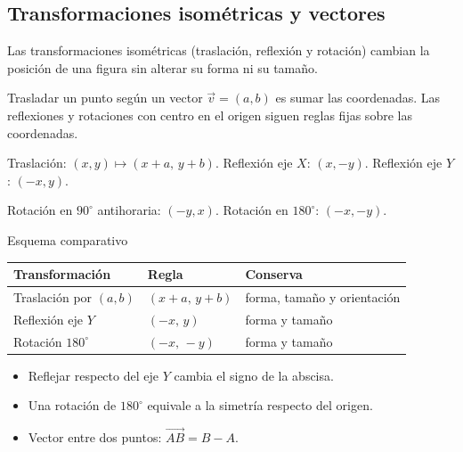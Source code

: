 \documentclass[10pt,a4paper,twocolumn]{article}
\begin{document}
\subsection{Transformaciones isométricas y vectores}

Las transformaciones isométricas (traslación, reflexión y rotación) cambian la posición de una figura sin alterar su forma ni su tamaño.

Trasladar un punto según un vector $\vec{v}=(a,b)$ es sumar las coordenadas. Las reflexiones y rotaciones con centro en el origen siguen reglas fijas sobre las coordenadas.

\begin{ley}
Traslación: $(x,y)\mapsto(x+a,\,y+b)$. Reflexión eje $X$: $(x,-y)$. Reflexión eje $Y$: $(-x,y)$.

Rotación en $90^\circ$ antihoraria: $(-y,x)$. Rotación en $180^\circ$: $(-x,-y)$.
\end{ley}

{\sffamily\footnotesize\color{zinc500} Esquema comparativo}
\begin{center}\small
\begin{tabular}{@{}>{\raggedright\arraybackslash}p{\dimexpr(\linewidth-4\tabcolsep)/3\relax}>{\raggedright\arraybackslash}p{\dimexpr(\linewidth-4\tabcolsep)/3\relax}>{\raggedright\arraybackslash}p{\dimexpr(\linewidth-4\tabcolsep)/3\relax}@{}}
\toprule
\textbf{Transformación} & \textbf{Regla} & \textbf{Conserva} \\
\midrule
Traslación por $(a,b)$ & $(x+a,\,y+b)$ & forma, tamaño y orientación \\
Reflexión eje $Y$ & $(-x,\,y)$ & forma y tamaño \\
Rotación $180^\circ$ & $(-x,\,-y)$ & forma y tamaño \\
\bottomrule
\end{tabular}
\end{center}

\begin{ideasclave}
\begin{itemize}
  \item Reflejar respecto del eje $Y$ cambia el signo de la abscisa.
  \item Una rotación de $180^\circ$ equivale a la simetría respecto del origen.
  \item Vector entre dos puntos: $\overrightarrow{AB}=B-A$.
\end{itemize}
\end{ideasclave}
\end{document}
